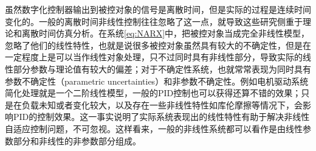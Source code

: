 虽然数字化控制器输出到被控对象的信号是离散时间，但是实际的过程是连续时间变化的。一般的离散时间非线性控制往往忽略了这一点，就导致这些研究侧重于理论和离散时间仿真分析。在系统\eqref{eq:NARX}中，把被控对象当成完全非线性模型，忽略了他们的线性特性，也就是说很多被控对象虽然具有较大的不确定性，但是在一定程度上是可以当作线性对象处理，只不过同时具有非线性部分，导致实际的线性部分参数与理论值有较大的偏差；对于不确定性系统，也就常常表现为同时具有参数不确定性（parametric uncertainties）和非参数不确定性。例如电机驱动系统简化处理就是一个二阶线性模型，一般的PID控制也可以获得还算不错的效果；只是在负载未知或者变化较大，以及存在一些非线性特性如库伦摩擦等情况下，会影响PID的控制效果。这一事实说明了实际系统表现出的线性特性有助于解决非线性自适应控制问题，不可忽视。这样看来，一般的非线性系统都可以看作是由线性参数部分和非线性的非参数部分组成。